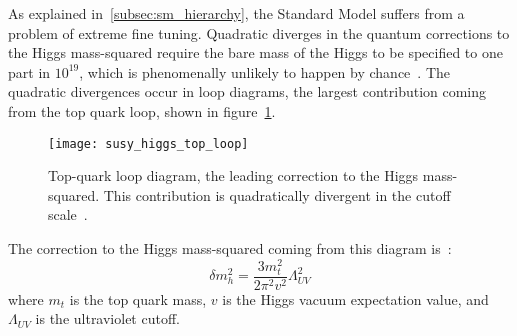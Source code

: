 As explained in~\ref{subsec:sm_hierarchy}, the Standard Model suffers from a problem of extreme fine tuning.
Quadratic diverges in the quantum corrections to the Higgs mass-squared require the bare mass of the Higgs to be
specified to one part in $10^{19}$, which is phenomenally unlikely to happen by chance~\cite{susy-higgs-fine-tuning}.
The quadratic divergences occur in loop diagrams, the largest contribution coming from the top quark loop, shown in figure~\ref{fig:susy_top_loop}.
\begin{figure}[!ht]
    \centering
\texttt{[image: susy\_higgs\_top\_loop]}
\caption{Top-quark loop diagram, the leading correction to the Higgs mass-squared. This contribution is quadratically divergent in the cutoff scale~\cite{susy-primer-1998}.}
\label{fig:susy_top_loop}
\end{figure}
The correction to the Higgs mass-squared coming from this diagram is~\cite{susy-primer-1998}:
\begin{equation}\label{eq:higgs_top_correction}
    \delta m_h^2 = \frac{3m_t^2}{2\pi^2 v^2}\Lambda_{UV}^2
\end{equation}
where $m_t$ is the top quark mass, $v$ is the Higgs vacuum expectation value, and $\Lambda_{UV}$ is the ultraviolet cutoff.


